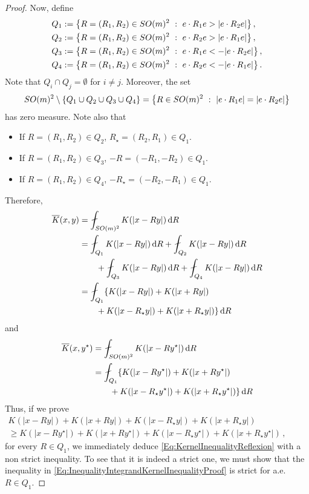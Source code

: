\begin{proof}
Now, define
\begin{align*}
Q_1 &:= \left \{ R = (R_1,R_2) \in SO(m)^2 \ : \ e\cdot R_1 e > |e\cdot R_2 e| \right \},\\
Q_2 &:= \left \{ R = (R_1,R_2) \in SO(m)^2 \ : \ e\cdot R_2 e > |e\cdot R_1 e| \right \},\\
Q_3 &:= \left \{ R = (R_1,R_2) \in SO(m)^2 \ : \ e\cdot R_1 e < -|e\cdot R_2 e| \right \},\\
Q_4 &:= \left \{ R = (R_1,R_2) \in SO(m)^2 \ : \ e\cdot R_2 e < - |e\cdot R_1 e| \right \}.
\end{align*}
Note that $Q_i \cap Q_j = \emptyset$ for $i\neq j$. Moreover, the set
$$
SO(m)^2 \setminus \{Q_1 \cup Q_2 \cup Q_3 \cup Q_4\} = \left \{ R\in SO(m)^2 \ : \ |e\cdot R_1 e| = |e\cdot R_2 e| \right \}
$$
has zero measure. Note also that
\begin{itemize}
\item If $R = (R_1, R_2)\in Q_2$, $R_\star = (R_2, R_1) \in Q_1$.
\item If $R = (R_1, R_2)\in Q_3$, $-R = (-R_1, -R_2) \in Q_1$.
\item If $R = (R_1, R_2)\in Q_4$, $-R_\star = (-R_2, -R_1) \in Q_1$.
\end{itemize}
Therefore,
\begin{align*}
\overline{K} (x, y) &= \average_{SO(m)^2} K(|x - R y|)\d R \\
& = \average_{Q_1} K(|x - R y|)\d R + \average_{Q_2} K(|x - R y|)\d R \\
& \quad \quad
+ \average_{Q_3} K(|x - R y|)\d R +
\average_{Q_4} K(|x - R y|)\d R \\
&= \average_{Q_1} \{K(|x - R y|) + K(|x + R y|) \\
&\quad \quad + K(|x - R_\star y|) + K(|x + R_\star y|)\}\d R
\end{align*}
and
\begin{align*}
\overline{K} (x, y^\star) &= \average_{SO(m)^2} K(|x - R y^\star|)\d R \\
& = \average_{Q_1} \{K(|x - R y^\star|) + K(|x + R y^\star|) \\
&\quad \quad + K(|x - R_\star y^\star|) + K(|x + R_\star y^\star|)\}\d R
\end{align*}
Thus, if we prove
\begin{equation}
\label{Eq:InequalityIntegrandKernelInequalityProof}
\begin{split}
K(|x - R y|) + K(|x + R y|) + K(|x - R_\star y|) + K(|x + R_\star y|)
\quad \quad \quad \quad \quad \quad \quad \quad
\\
\geq
K(|x - R y^\star|) + K(|x + R y^\star|)+K(|x - R_\star y^\star|) + K(|x + R_\star y^\star|)\,,
\end{split}
\end{equation}
for every $R\in Q_1$, we immediately deduce \eqref{Eq:KernelInequalityReflexion} with a non strict
inequality. To see that it is indeed a strict one, we must show that the inequality in
\eqref{Eq:InequalityIntegrandKernelInequalityProof} is strict for a.e. $R \in Q_1$.



\end{proof}
